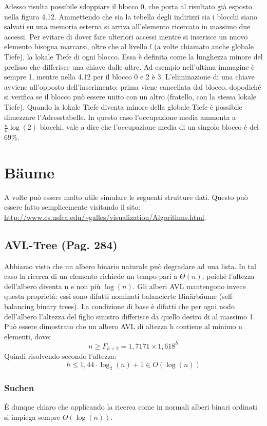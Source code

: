 \documentclass[a4paper]{book}
\begin{document}
Adesso risulta possibile sdoppiare il blocco 0, che porta al risultato già esposto nella figura 4.12.
Ammettendo che sia la tebella degli indirizzi sia i blocchi siano salvati su una memoria esterna si arriva all'elemento ricercato in massimo due accessi. Per evitare di dover fare ulteriori accessi mentre si inserisce un nuovo elemento bisogna marcarsi, oltre che al livello $l$ (a volte chiamato anche globale Tiefe), la lokale Tiefe di ogni blocco. Essa è definita come la lunghezza minore del prefisso che differisce una chiave dalle altre. Ad esempio nell'ultima immagine è sempre 1, mentre nella 4.12 per il blocco 0 e 2 è 3.
L'eliminazione di una chiave avviene all'opposto dell'inserimento: prima viene cancellata dal blocco, dopodiché si verifica se il blocco può essere unito con un altro (fratello, con la stessa lokale Tiefe). Quando la lokale Tiefe diventa minore della globale Tiefe è possibile dimezzare l'Adresstabelle. In questo caso l'occupazione media ammonta a $\frac{n}{b}\log(2)$ blocchi, vale a dire che l'occupazione media di un singolo blocco è del 69\%. 
\chapter{Bäume}
A volte può essere molto utile simulare le seguenti strutture dati. Questo può essere fatto semplicemente visitando il sito: \url{http://www.cs.usfca.edu/~galles/visualization/Algorithms.html}.
\section{AVL-Tree (Pag. 284)}
Abbiamo visto che un albero binario naturale può degradare ad una lista. In tal caso la ricerca di un elemento richiede un tempo pari a $\Theta (n)$, poiché l'altezza dell'albero diventa n e non più $\log(n)$. Gli alberi AVL mantengono invece questa proprietà: essi sono difatti nominati balancierte Binärbäume (self-balancing binary trees). La condizione di base è difatti che per ogni nodo dell'albero l'altezza del figlio sinistro differisce da quello destro di al massimo 1. Può essere dimostrato che un albero AVL di altezza h contiene al minimo n elementi, dove:
$$ n\geq F_{h+2} = 1,7171\times 1,618^h$$
Quindi risolvendo secondo l'altezza:
$$ h\leq 1,44 \cdot\log_2 (n)+1 \in O(\log(n))$$
\subsection*{Suchen}
È dunque chiaro che applicando la ricerca come in normali alberi binari ordinati si impiega sempre $O(\log(n))$.
\end{document}
